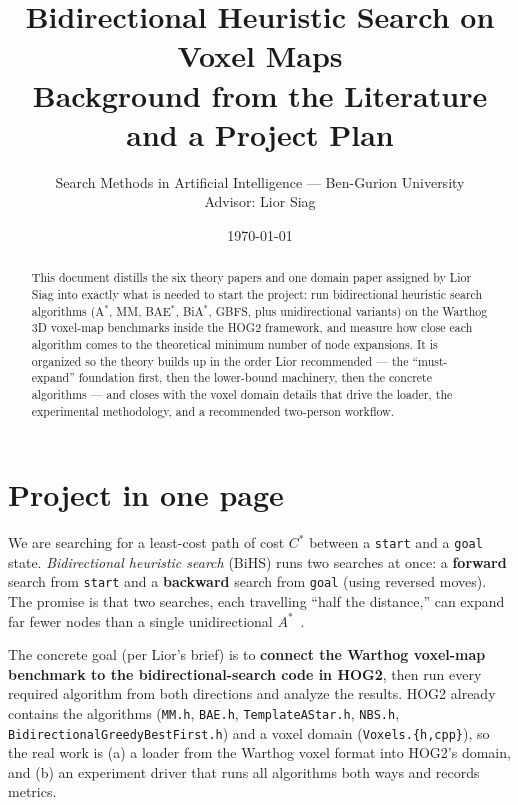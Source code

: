 \documentclass[11pt]{article}
\title{\vspace{-1.5em}Bidirectional Heuristic Search on Voxel Maps\\[0.3em]
\large Background from the Literature and a Project Plan}
\author{Search Methods in Artificial Intelligence --- Ben-Gurion University\\
Advisor: Lior Siag}
\date{\today}
\newcommand{\Cstar}{C^{*}}
\begin{document}
\maketitle
\vspace{-1em}

\begin{abstract}
\noindent This document distills the six theory papers and one domain paper assigned by
Lior Siag into exactly what is needed to start the project: run bidirectional heuristic
search algorithms (A$^{*}$, MM, BAE$^{*}$, BiA$^{*}$, GBFS, plus unidirectional variants)
on the Warthog 3D voxel-map benchmarks inside the HOG2 framework, and measure how close
each algorithm comes to the theoretical minimum number of node expansions. It is organized
so the theory builds up in the order Lior recommended --- the ``must-expand'' foundation
first, then the lower-bound machinery, then the concrete algorithms --- and closes with the
voxel domain details that drive the loader, the experimental methodology, and a recommended
two-person workflow.
\end{abstract}

\tableofcontents

\section{Project in one page}
\label{sec:overview}

We are searching for a least-cost path of cost $\Cstar$ between a \texttt{start} and a
\texttt{goal} state. \emph{Bidirectional heuristic search} (BiHS) runs two searches at
once: a \textbf{forward} search from \texttt{start} and a \textbf{backward} search from
\texttt{goal} (using reversed moves). The promise is that two searches, each travelling
``half the distance,'' can expand far fewer nodes than a single unidirectional
$A^{*}$~\citep{holte2017mm}.

The concrete goal (per Lior's brief) is to \textbf{connect the Warthog voxel-map benchmark
to the bidirectional-search code in HOG2}, then run every required algorithm from both
directions and analyze the results. HOG2 already contains the algorithms
(\texttt{MM.h}, \texttt{BAE.h}, \texttt{TemplateAStar.h}, \texttt{NBS.h},
\texttt{BidirectionalGreedyBestFirst.h}) and a voxel domain (\texttt{Voxels.\{h,cpp\}}),
so the real work is (a) a loader from the Warthog voxel format into HOG2's domain, and
(b) an experiment driver that runs all algorithms both ways and records metrics.
\end{document}
